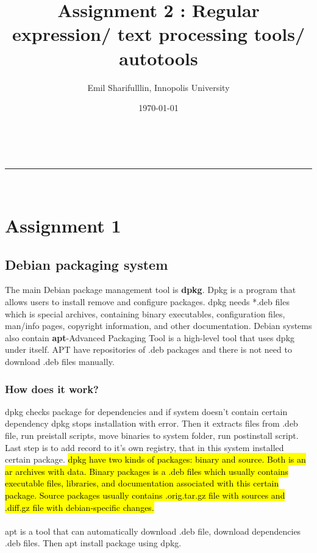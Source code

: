 \documentclass[a4paper,11pt]{article}
\makeatletter
\newcommand*{\TitleFont}{%
      \usefont{\encodingdefault}{\rmdefault}{b}{n}%
      \fontsize{16}{20}%
      \selectfont}
\renewcommand{\maketitle}{
\begin{center}
\vspace{2ex}
{\huge \textsc{\@title}}
\vspace{1ex}
\\
\rule{\linewidth}{0.5pt}\\
\@author \hfill \@date
\vspace{4ex}
\end{center}
}
\makeatother
\begin{document}







\title{ \TitleFont Assignment 2 : Regular expression/ text processing tools/ autotools }

\author{Emil Sharifulllin, Innopolis University}

\date{\today}

\maketitle

\tableofcontents

\section{Assignment 1}

\subsection{Debian packaging system}
The main Debian package management tool is \textbf{dpkg}. Dpkg is a program that allows users to install remove and configure packages. dpkg needs *.deb files which is special archives, containing binary executables, configuration files, man/info pages, copyright information, and other documentation. Debian systems also contain \textbf{apt}-Advanced Packaging Tool is a high-level tool that uses dpkg under itself. APT have repositories of .deb packages and there is not need to download .deb files manually.

\subsubsection{How does it work?}
dpkg checks package for dependencies and if system doesn't contain certain dependency dpkg stops installation with error. Then it extracts files from .deb file, run preistall scripts, move binaries to system folder, run postinstall script. Last step is to add record to it's own registry, that in this system installed certain package. \hl{dpkg have two kinds of packages: binary and source. Both is an ar archives with data. Binary packages is a .deb files which usually contains executable files, libraries, and documentation associated with this certain package. Source packages usually contains .orig.tar.gz file with sources and .diff.gz file with debian-specific changes.}\\\\
apt is a tool that can automatically download .deb file, download dependencies .deb files. Then apt install package using dpkg.
\end{document}
